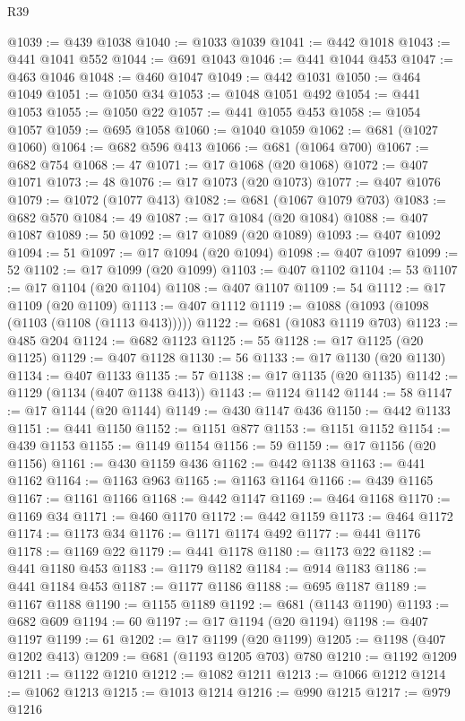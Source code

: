 \begin{lexlean}{R39}
\begin{coremodule}
@1039 := @439 @1038
@1040 := @1033 @1039
@1041 := @442 @1018
@1043 := @441 @1041 @552
@1044 := @691 @1043
@1046 := @441 @1044 @453
@1047 := @463 @1046
@1048 := @460 @1047
@1049 := @442 @1031
@1050 := @464 @1049
@1051 := @1050 @34
@1053 := @1048 @1051 @492
@1054 := @441 @1053
@1055 := @1050 @22
@1057 := @441 @1055 @453
@1058 := @1054 @1057
@1059 := @695 @1058
@1060 := @1040 @1059
@1062 := @681 (@1027 @1060)
@1064 := @682 @596 @413
@1066 := @681 (@1064 @700)
@1067 := @682 @754
@1068 := 47
@1071 := @17 @1068 (@20 @1068)
@1072 := @407 @1071
@1073 := 48
@1076 := @17 @1073 (@20 @1073)
@1077 := @407 @1076
@1079 := @1072 (@1077 @413)
@1082 := @681 (@1067 @1079 @703)
@1083 := @682 @570
@1084 := 49
@1087 := @17 @1084 (@20 @1084)
@1088 := @407 @1087
@1089 := 50
@1092 := @17 @1089 (@20 @1089)
@1093 := @407 @1092
@1094 := 51
@1097 := @17 @1094 (@20 @1094)
@1098 := @407 @1097
@1099 := 52
@1102 := @17 @1099 (@20 @1099)
@1103 := @407 @1102
@1104 := 53
@1107 := @17 @1104 (@20 @1104)
@1108 := @407 @1107
@1109 := 54
@1112 := @17 @1109 (@20 @1109)
@1113 := @407 @1112
@1119 := @1088 (@1093 (@1098 (@1103 (@1108 (@1113 @413)))))
@1122 := @681 (@1083 @1119 @703)
@1123 := @485 @204
@1124 := @682 @1123
@1125 := 55
@1128 := @17 @1125 (@20 @1125)
@1129 := @407 @1128
@1130 := 56
@1133 := @17 @1130 (@20 @1130)
@1134 := @407 @1133
@1135 := 57
@1138 := @17 @1135 (@20 @1135)
@1142 := @1129 (@1134 (@407 @1138 @413))
@1143 := @1124 @1142
@1144 := 58
@1147 := @17 @1144 (@20 @1144)
@1149 := @430 @1147 @436
@1150 := @442 @1133
@1151 := @441 @1150
@1152 := @1151 @877
@1153 := @1151 @1152
@1154 := @439 @1153
@1155 := @1149 @1154
@1156 := 59
@1159 := @17 @1156 (@20 @1156)
@1161 := @430 @1159 @436
@1162 := @442 @1138
@1163 := @441 @1162
@1164 := @1163 @963
@1165 := @1163 @1164
@1166 := @439 @1165
@1167 := @1161 @1166
@1168 := @442 @1147
@1169 := @464 @1168
@1170 := @1169 @34
@1171 := @460 @1170
@1172 := @442 @1159
@1173 := @464 @1172
@1174 := @1173 @34
@1176 := @1171 @1174 @492
@1177 := @441 @1176
@1178 := @1169 @22
@1179 := @441 @1178
@1180 := @1173 @22
@1182 := @441 @1180 @453
@1183 := @1179 @1182
@1184 := @914 @1183
@1186 := @441 @1184 @453
@1187 := @1177 @1186
@1188 := @695 @1187
@1189 := @1167 @1188
@1190 := @1155 @1189
@1192 := @681 (@1143 @1190)
@1193 := @682 @609
@1194 := 60
@1197 := @17 @1194 (@20 @1194)
@1198 := @407 @1197
@1199 := 61
@1202 := @17 @1199 (@20 @1199)
@1205 := @1198 (@407 @1202 @413)
@1209 := @681 (@1193 @1205 @703) @780
@1210 := @1192 @1209
@1211 := @1122 @1210
@1212 := @1082 @1211
@1213 := @1066 @1212
@1214 := @1062 @1213
@1215 := @1013 @1214
@1216 := @990 @1215
@1217 := @979 @1216

\end{coremodule}
\end{lexlean}
